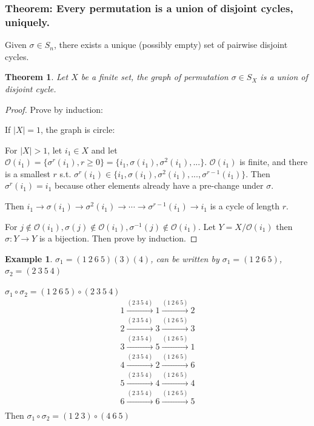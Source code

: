 \documentclass[11pt,a4paper]{article}
\newtheorem{theorem}{Theorem}
\newtheorem{example}{Example}
\begin{document}
\subsubsection{Theorem: Every permutation is a union of disjoint
cycles, uniquely.}
Given $\sigma\in S_n$, there exists a unique (possibly empty) set of pairwise disjoint cycles.
\begin{theorem}
Let $X$ be a finite set, the graph of permutation $\sigma\in S_X$ is a union of disjoint cycle.
\end{theorem}
\begin{proof}
Prove by induction:

If $|X|=1$, the graph is circle:

For $|X|>1$, let $i_1\in X$ and let $\mathcal{O}(i_1)=\{\sigma^r(i_1),r\geq 0\}=\{i_1,\sigma(i_1),\sigma^2(i_1),...\}$. $\mathcal{O}(i_1)$ is finite, and there is a smallest $r$ s.t. $\sigma^r(i_1)\in\{i_1,\sigma(i_1),\sigma^2(i_1),...,\sigma^{r-1}(i_1)\}$. Then $\sigma^r(i_1)=i_1$ because other elements already have a pre-change under $\sigma$.

Then $i_1 \rightarrow \sigma(i_1) \rightarrow \sigma^2(i_1)\rightarrow \cdots \rightarrow \sigma^{r-1}(i_1) \rightarrow	i_1$ is a cycle of length $r$.

For $j\notin \mathcal{O}(i_1), \sigma(j)\notin \mathcal{O}(i_1), \sigma^{-1}(j)\notin \mathcal{O}(i_1)$. Let $Y=X/\mathcal{O}(i_1)$ then $\sigma: Y \rightarrow	Y$ is a bijection. Then prove by induction.

\end{proof}

\begin{example}
$\sigma_1=(1\ 2\ 6\ 5)(3)(4)$, can be written by $\sigma_1=(1\ 2\ 6\ 5)$, $\sigma_2=(2\ 3\ 5\ 4)$
\end{example}
$\sigma_1 \circ \sigma_2=(1\ 2\ 6\ 5)\circ (2\ 3\ 5\ 4)$
\begin{equation}
    \begin{aligned}
        1 \stackrel{(2\ 3\ 5\ 4)}{\longrightarrow} 1 \stackrel{(1\ 2\ 6\ 5)}{\longrightarrow} 2\\
        2 \stackrel{(2\ 3\ 5\ 4)}{\longrightarrow} 3 \stackrel{(1\ 2\ 6\ 5)}{\longrightarrow} 3\\
        3 \stackrel{(2\ 3\ 5\ 4)}{\longrightarrow} 5 \stackrel{(1\ 2\ 6\ 5)}{\longrightarrow} 1\\
        4 \stackrel{(2\ 3\ 5\ 4)}{\longrightarrow} 2 \stackrel{(1\ 2\ 6\ 5)}{\longrightarrow} 6\\
        5 \stackrel{(2\ 3\ 5\ 4)}{\longrightarrow} 4 \stackrel{(1\ 2\ 6\ 5)}{\longrightarrow} 4\\
        6 \stackrel{(2\ 3\ 5\ 4)}{\longrightarrow} 6 \stackrel{(1\ 2\ 6\ 5)}{\longrightarrow} 5\\
    \end{aligned}
    \nonumber
\end{equation}
Then $\sigma_1 \circ \sigma_2=(1\ 2\ 3)\circ (4\ 6\ 5)$
\end{document}
